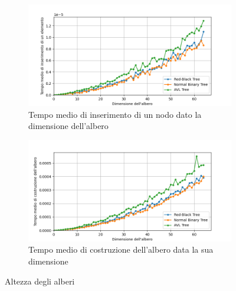 \documentclass[a4paper,12pt]{article}
\begin{document}
    \begin{figure}[htb!]
        \centering
        \begin{subfigure}{0.49\textwidth}
            \includegraphics[width=\linewidth]{Tempo medio di inserimento}
            \caption{Tempo medio di inserimento di un nodo dato la dimensione dell'albero}
        \end{subfigure}
        \hfill
        \begin{subfigure}{0.49\textwidth}
            \includegraphics[width=\linewidth]{Tempo medio di costruzione}
            \caption{Tempo medio di costruzione dell'albero data la sua dimensione}
        \end{subfigure}
        \caption{Altezza degli alberi}
    \end{figure}
\end{document}
